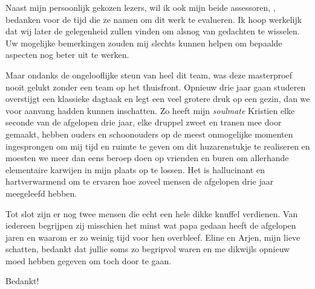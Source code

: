 \begin{preface}
Naast mijn persoonlijk gekozen lezers, wil ik ook mijn beide assessoren, \TODO,
bedanken voor de tijd die ze namen om dit werk te evalueren. Ik hoop werkelijk
dat wij later de gelegenheid zullen vinden om alsnog van gedachten te wisselen.
Uw mogelijke bemerkingen zouden mij slechts kunnen helpen om bepaalde aspecten
nog beter uit te werken.

Maar ondanks de ongelooflijke steun van heel dit team, was deze masterproef
nooit gelukt zonder een team op het thuisfront. Opnieuw drie jaar gaan studeren
overstijgt een klassieke dagtaak en legt een veel grotere druk op een gezin,
dan we voor aanvang hadden kunnen inschatten. Zo heeft mijn \emph{soulmate}
Kristien elke seconde van de afgelopen drie jaar, elke druppel zweet en tranen
mee door gemaakt, hebben ouders en schoonouders op de meest onmogelijke
momenten ingesprongen om mij tijd en ruimte te geven om dit huzarenstukje te
realiseren en moesten we meer dan eens beroep doen op vrienden en buren om
allerhande elementaire karwijen in mijn plaats op te lossen. Het is hallucinant
en hartverwarmend om te ervaren hoe zoveel mensen de afgelopen drie jaar
meegeleefd hebben.

Tot slot zijn er nog twee mensen die echt een hele dikke knuffel verdienen. Van
iedereen begrijpen zij misschien het minst wat papa gedaan heeft de afgelopen
jaren en waarom er zo weinig tijd voor hen overbleef. Eline en Arjen, mijn
lieve schatten, bedankt dat jullie soms zo begripvol waren en me dikwijls
opnieuw moed hebben gegeven om toch door te gaan.

\bigskip

Bedankt!

\end{preface}

